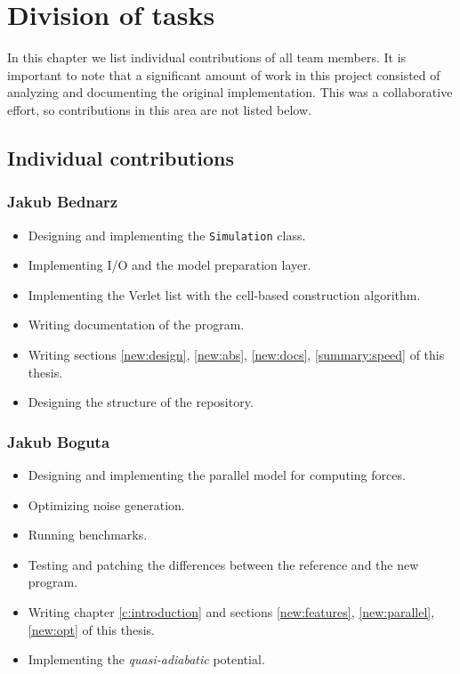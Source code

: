 \chapter{Division of tasks}\label{c:division}

In this chapter we list individual contributions of all team members. It is important to note that a significant amount of work in this project consisted of analyzing and documenting the original implementation. This was a collaborative effort, so contributions in this area are not listed below.

\section{Individual contributions}
\subsection*{Jakub Bednarz}
\begin{itemize}
    \item Designing and implementing the \texttt{Simulation} class. 
    \item Implementing I/O and the model preparation layer.
    \item Implementing the Verlet list with the cell-based construction algorithm.
    \item Writing documentation of the program.
    \item Writing sections \ref{new:design}, \ref{new:abs}, \ref{new:docs}, \ref{summary:speed} of this thesis.
    \item Designing the structure of the repository.
\end{itemize}
\subsection*{Jakub Boguta}
\begin{itemize}
    \item Designing and implementing the parallel model for computing forces.
    \item Optimizing noise generation.
    \item Running benchmarks.
    \item Testing and patching the differences between the reference and the new program.
    \item Writing chapter \ref{c:introduction} and sections \ref{new:features}, \ref{new:parallel}, \ref{new:opt} of this thesis.
    \item Implementing the \emph{quasi-adiabatic} potential.
\end{itemize}
